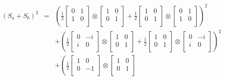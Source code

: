 \begin{eqnarray}
(S_a + S_b)^2 &=& 
\left(
	\frac{1}{2}
	\left[  \begin{array}{cc}
	0 & 1\\
	1 & 0\\
 	\end{array} \right] \otimes 
 	\left[  \begin{array}{cc}
	1 & 0\\
	0 & 1\\
	 \end{array} \right] 
	 +
	 	\frac{1}{2}
	\left[  \begin{array}{cc}
	1 & 0\\
	0 & 1\\
 	\end{array} \right] \otimes \nonumber
 	\left[  \begin{array}{cc}
	0 & 1\\
	1 & 0\\
	 \end{array} \right] 
	 \right)^2\\
	 &&+
	 \left(
	\frac{1}{2}
	\left[  \begin{array}{cc}
	0 & -i\\
	i & 0\\
 	\end{array} \right] \otimes 
 	\left[  \begin{array}{cc}
	1 & 0\\
	0 & 1\\
	 \end{array} \right] 
	 +
	 	\frac{1}{2}
	\left[  \begin{array}{cc}
	1 & 0\\
	0 & 1\\
 	\end{array} \right] \otimes 
 	\left[  \begin{array}{cc}
	0 & -i\\
	i & 0\\
	 \end{array} \right] 
	 \right)^2\\
	 &&+
	 \left(
	\frac{1}{2}
	\left[  \begin{array}{cc}
	1 & 0\\
	0 & -1\\
 	\end{array} \right] \otimes 
 	\left[  \begin{array}{cc}
	1 & 0\\
	0 & 1\\
	 \end{array} \right] 

\end{eqnarray}
